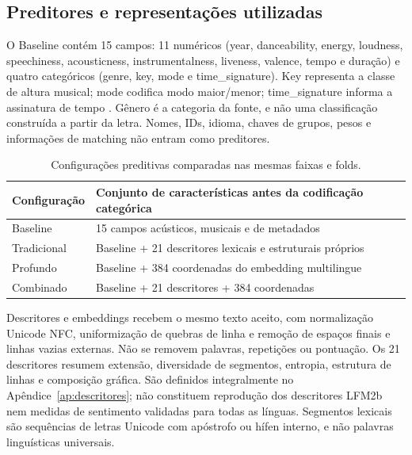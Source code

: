 \FloatBarrier
\subsection{Preditores e representações utilizadas}\label{subsec:representacoes}
O Baseline contém 15 campos: 11 numéricos (year, danceability, energy, loudness, speechiness, acousticness, instrumentalness, liveness, valence, tempo e duração) e quatro categóricos (genre, key, mode e time\_signature). Key representa a classe de altura musical; mode codifica modo maior/menor; time\_signature informa a assinatura de tempo \cite{spotifyaudio}. Gênero é a categoria da fonte, e não uma classificação construída a partir da letra. Nomes, IDs, idioma, chaves de grupos, pesos e informações de matching não entram como preditores.

\begin{table}[htbp]\centering\small
\caption{Configurações preditivas comparadas nas mesmas faixas e folds.}\label{tab:blocos}
\begin{tabular}{lP{.65\linewidth}}\toprule
Configuração & Conjunto de características antes da codificação categórica \\\midrule
Baseline & 15 campos acústicos, musicais e de metadados \\
Tradicional & Baseline + 21 descritores lexicais e estruturais próprios \\
Profundo & Baseline + 384 coordenadas do embedding multilingue \\
Combinado & Baseline + 21 descritores + 384 coordenadas \\
\bottomrule\end{tabular}
\end{table}

Descritores e embeddings recebem o mesmo texto aceito, com normalização Unicode NFC, uniformização de quebras de linha e remoção de espaços finais e linhas vazias externas. Não se removem palavras, repetições ou pontuação. Os 21 descritores resumem extensão, diversidade de segmentos, entropia, estrutura de linhas e composição gráfica. São definidos integralmente no Apêndice~\ref{ap:descritores}; não constituem reprodução dos descritores LFM2b nem medidas de sentimento validadas para todas as línguas. Segmentos lexicais são sequências de letras Unicode com apóstrofo ou hífen interno, e não palavras linguísticas universais.

